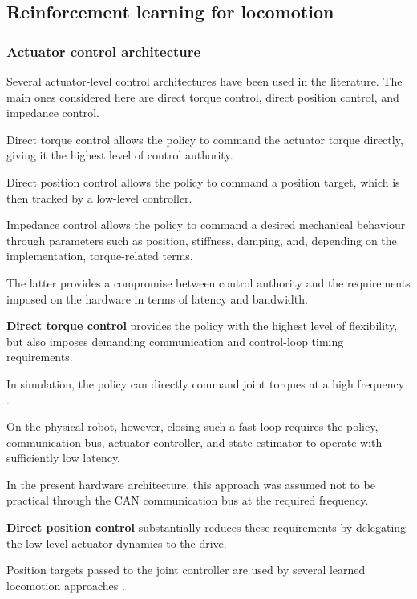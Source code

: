 \subsection{Reinforcement learning for locomotion}

\label{sec:bg-rl-loco}

\subsubsection{Actuator control architecture}

Several actuator-level control architectures have been used in the literature. The main ones considered here are direct torque control, direct position control, and impedance control.

Direct torque control allows the policy to command the actuator torque directly, giving it the highest level of control authority.

Direct position control allows the policy to command a position target, which is then tracked by a low-level controller.

Impedance control allows the policy to command a desired mechanical behaviour through parameters such as position, stiffness, damping, and, depending on the implementation, torque-related terms.

The latter provides a compromise between control authority and the requirements imposed on the hardware in terms of latency and bandwidth.

\textbf{Direct torque control} provides the policy with the highest level of flexibility, but also imposes demanding communication and control-loop timing requirements.

In simulation, the policy can directly command joint torques at a high frequency \cite{hwangbo2019anymal}.

On the physical robot, however, closing such a fast loop requires the policy, communication bus, actuator controller, and state estimator to operate with sufficiently low latency.

In the present hardware architecture, this approach was assumed not to be practical through the CAN communication bus at the required frequency.

\textbf{Direct position control} substantially reduces these requirements by delegating the low-level actuator dynamics to the drive.

Position targets passed to the joint controller are used by several learned locomotion approaches \cite{tan2018sim2real,rudin2021}.

